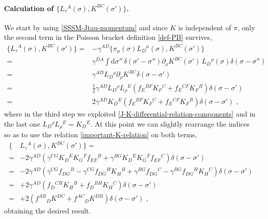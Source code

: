 \documentclass[12pt]{article}
\numberwithin{equation}{section}
\begin{document}
\paragraph{Calculation of $\{ L_{\tau}{}^{A}(\sigma),K^{BC}(\sigma') \}$.} We start by using \eqref{SSSM-Jtau-momentum} and since $K$ is independent of $\pi$, only the second term in the Poisson bracket definition \eqref{def-PB} survives,
\begin{equation}\label{SSSM-Jtau-K-bracket}
\begin{aligned}
\{ L_{\tau}{}^{A}(\sigma),K^{BC}(\sigma') \}=&-\gamma^{AD} \{ \pi_{\mu}(\sigma)L_{D}{}^{\mu}(\sigma),K^{BC}(\sigma') \}
\\
=&\gamma^{DA}\int \mathrm{d}\sigma'' \, \delta(\sigma'-\sigma'')\partial_{\rho}K^{BC}(\sigma') \, L_{D}{}^{\rho}(\sigma)\delta(\sigma-\sigma'')
\\
=&\gamma^{AD}L_{D}{}^{\rho}\partial_{\rho}K^{BC} \delta(\sigma-\sigma')
\\
=&\tfrac{1}{2}\gamma^{AD}L_{D}{}^{\rho}L_{\rho}{}^{E}(f_{E}{}^{BF}K_{F}{}^{C}+f_{E}{}^{CF}K_{F}{}^{B})\delta(\sigma-\sigma')
\\
=& 2\gamma^{AD}K_{D}{}^{E}(f_{E}{}^{BF}K_{F}{}^{C}+f_{E}{}^{CF}K_{F}{}^{B})\delta(\sigma-\sigma') \,\, ,
\end{aligned}
\end{equation}
where in the third step we exploited \eqref{J-K-differential-relation-components} and in the last one $L_{D}{}^{\rho}L_{\rho}{}^{E}=K_{D}{}^{E}$. At this point we can slightly rearrange the indices so as to use the relation \eqref{important-K-relation} on both terms,
\begin{equation}
\begin{aligned}
\{ &L_{\tau}{}^{A}(\sigma),K^{BC}(\sigma') \}=
\\
=&-2\gamma^{AD}(\gamma^{CG}K_{D}{}^{E}K_{G}{}^{F}f_{EF}{}^{B}+\gamma^{BG}K_{D}{}^{E}K_{G}{}^{F}f_{EF}{}^{C})\delta(\sigma-\sigma')
\\
=& -2\gamma^{AD}(\gamma^{CG}f_{DG}{}^{B}-\gamma^{CG}f_{DG}{}^{H}K_{H}{}^{B}+\gamma^{BG}f_{DG}{}^{C}-\gamma^{BG}f_{DG}{}^{H}K_{H}{}^{C})\delta(\sigma-\sigma')
\\
=&+2\gamma^{AD}(f_{D}{}^{CH}K_{H}{}^{B}+f_{D}{}^{BH}K_{H}{}^{C})\delta(\sigma-\sigma')
\\
=&+2(f^{AB}{}_{D}K^{DC}+f^{AC}{}_{D}K^{DB})\delta(\sigma-\sigma') \,\, ,
\end{aligned}
\end{equation}
obtaining the desired result.
\end{document}
